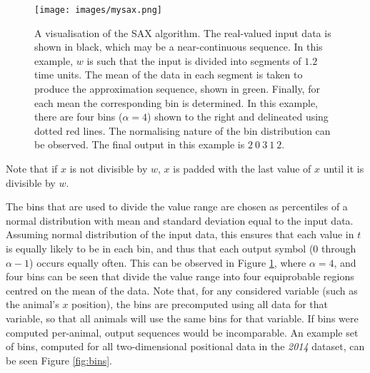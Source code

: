 \documentclass[conference,a4paper,twoside]{IEEEtran}
\begin{document}
\begin{figure}
    \centering
    \texttt{[image: images/mysax.png]}
    \caption{A visualisation of the SAX algorithm. The real-valued input data is shown in black, which may be a near-continuous sequence. In this example, $w$ is such that the input is divided into segments of $1.2$ time units. The mean of the data in each segment is taken to produce the approximation sequence, shown in green. Finally, for each mean the corresponding bin is determined. In this example, there are four bins ($\alpha = 4$) shown to the right and delineated using dotted red lines. The normalising nature of the bin distribution can be observed. The final output in this example is $2\ 0\ 3\ 1\ 2$.}
    \label{fig:sax}
\end{figure}


Note that if $x$ is not divisible by $w$, $x$ is padded with the last value of $x$ until it is divisible by $w$.

The bins that are used to divide the value range are chosen as percentiles of a normal distribution with mean and standard deviation equal to the input data. Assuming normal distribution of the input data, this ensures that each value in $t$ is equally likely to be in each bin, and thus that each output symbol (0 through $\alpha-1$) occurs equally often. This can be observed in Figure \ref{fig:sax}, where $\alpha = 4$, and four bins can be seen that divide the value range into four equiprobable regions centred on the mean of the data. Note that, for any considered variable (such as the animal's $x$ position), the bins are precomputed using all data for that variable, so that all animals will use the same bins for that variable. If bins were computed per-animal, output sequences would be incomparable. An example set of bins, computed for all two-dimensional positional data in the \emph{2014} dataset, can be seen Figure \ref{fig:bins}.
\end{document}
